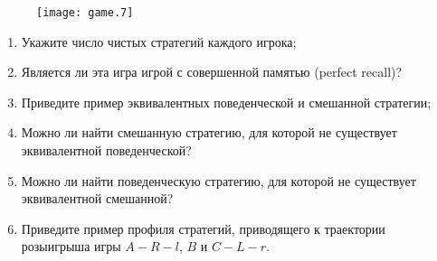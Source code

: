 \begin{problem}
\begin{figure}[ht]
     \texttt{[image: game.7]}
\end{figure}

\begin{enumerate}
\item Укажите число чистых стратегий каждого игрока;\par
\item Является ли эта игра игрой с совершенной памятью (perfect recall)?\par
\item  Приведите пример эквивалентных поведенческой и смешанной стратегии; \par
\item Можно ли найти смешанную стратегию, для которой не существует эквивалентной поведенческой? \par
\item Можно ли найти поведенческую стратегию, для которой не существует эквивалентной смешанной? \par
\item Приведите пример профиля стратегий, приводящего к  траектории розыигрыша игры  $A-R-l$,  $B$  и  $C-L-r$.
\end{enumerate}


\begin{sol}

\end{sol}
\end{problem}




